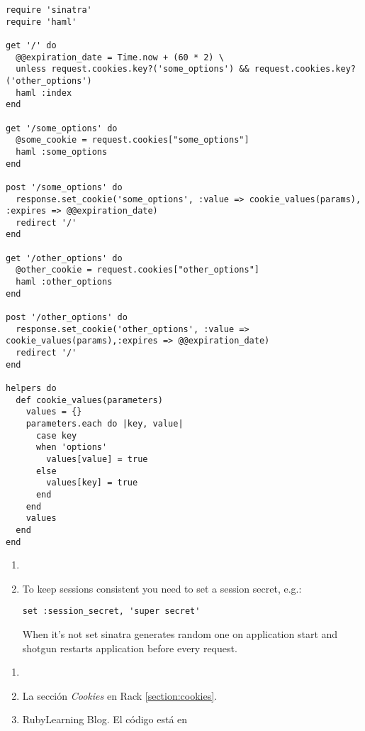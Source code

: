 \begin{verbatim}
require 'sinatra'
require 'haml'

get '/' do
  @@expiration_date = Time.now + (60 * 2) \
  unless request.cookies.key?('some_options') && request.cookies.key?('other_options')
  haml :index
end

get '/some_options' do
  @some_cookie = request.cookies["some_options"]
  haml :some_options
end

post '/some_options' do  
  response.set_cookie('some_options', :value => cookie_values(params), :expires => @@expiration_date)
  redirect '/'
end

get '/other_options' do
  @other_cookie = request.cookies["other_options"]
  haml :other_options
end

post '/other_options' do
  response.set_cookie('other_options', :value => cookie_values(params),:expires => @@expiration_date)
  redirect '/'
end

helpers do
  def cookie_values(parameters)
    values = {}
    parameters.each do |key, value|
      case key
      when 'options'
        values[value] = true
      else
        values[key] = true
      end
    end
    values
  end
end
\end{verbatim}

\begin{enumerate}
\item 
{}
\item 
To keep sessions consistent you need to set a session secret, e.g.:

\begin{verbatim}
set :session_secret, 'super secret'
\end{verbatim}
When it's not set sinatra generates random one on application start
and shotgun restarts application before every request.
\end{enumerate}


\begin{enumerate}
\item 
{}
\item 
La sección {\it Cookies} en Rack \ref{section:cookies}.
\item 
{}
RubyLearning Blog. El código está en
\end{enumerate}


